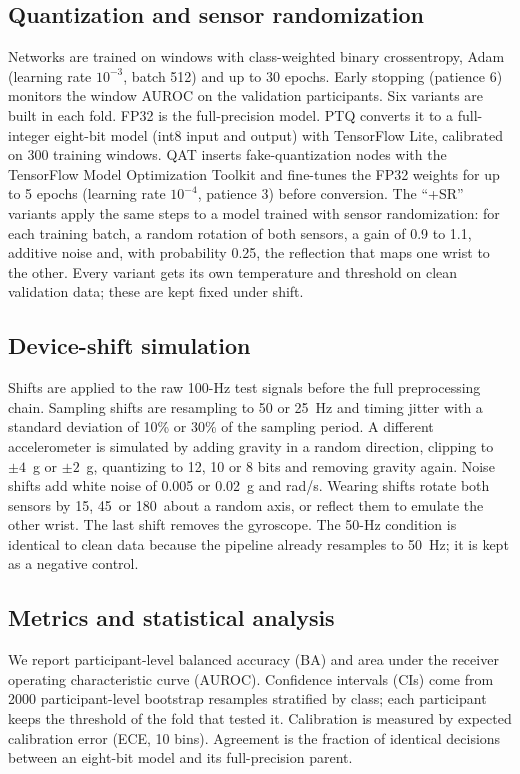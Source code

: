 \documentclass[preprint,12pt]{elsarticle}
\begin{document}
\subsection{Quantization and sensor randomization}
Networks are trained on windows with class-weighted binary cross\-entropy, Adam (learning rate $10^{-3}$, batch 512) and up to 30 epochs. Early stopping (patience 6) monitors the window AUROC on the validation participants. Six variants are built in each fold. FP32 is the full-precision model. PTQ converts it to a full-integer eight-bit model (int8 input and output) with TensorFlow Lite, calibrated on 300 training windows. QAT inserts fake-quantization nodes with the TensorFlow Model Optimization Toolkit and fine-tunes the FP32 weights for up to 5 epochs (learning rate $10^{-4}$, patience 3) before conversion. The ``+SR'' variants apply the same steps to a model trained with sensor randomization: for each training batch, a random rotation of both sensors, a gain of 0.9 to 1.1, additive noise and, with probability 0.25, the reflection that maps one wrist to the other. Every variant gets its own temperature and threshold on clean validation data; these are kept fixed under shift.

\subsection{Device-shift simulation}
Shifts are applied to the raw 100-Hz test signals before the full preprocessing chain. Sampling shifts are resampling to 50 or 25~Hz and timing jitter with a standard deviation of 10\% or 30\% of the sampling period. A different accelerometer is simulated by adding gravity in a random direction, clipping to $\pm4$~g or $\pm2$~g, quantizing to 12, 10 or 8 bits and removing gravity again. Noise shifts add white noise of 0.005 or 0.02~g and rad/s. Wearing shifts rotate both sensors by 15\textdegree, 45\textdegree\ or 180\textdegree\ about a random axis, or reflect them to emulate the other wrist. The last shift removes the gyroscope. The 50-Hz condition is identical to clean data because the pipeline already resamples to 50~Hz; it is kept as a negative control.

\subsection{Metrics and statistical analysis}
We report participant-level balanced accuracy (BA) and area under the receiver operating characteristic curve (AUROC). Confidence intervals (CIs) come from 2000 participant-level bootstrap resamples stratified by class; each participant keeps the threshold of the fold that tested it. Calibration is measured by expected calibration error (ECE, 10 bins). Agreement is the fraction of identical decisions between an eight-bit model and its full-precision parent.
\end{document}
